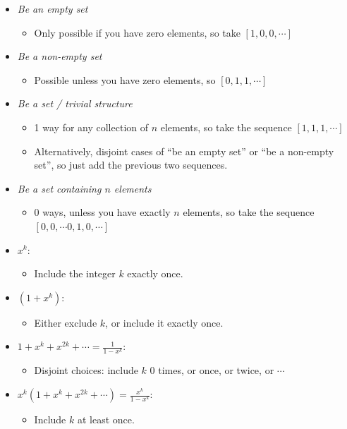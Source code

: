 \begin{itemize}
\tightlist
\item
  \emph{Be an empty set}

  \begin{itemize}
  \tightlist
  \item
    Only possible if you have zero elements, so take \([1,0,0,\cdots]\)
  \end{itemize}
\item
  \emph{Be a non-empty set}

  \begin{itemize}
  \tightlist
  \item
    Possible unless you have zero elements, so \([0, 1, 1, \cdots]\)
  \end{itemize}
\item
  \emph{Be a set / trivial structure}

  \begin{itemize}
  \tightlist
  \item
    1 way for any collection of \(n\) elements, so take the sequence
    \([1,1,1,\cdots]\)
  \item
    Alternatively, disjoint cases of ``be an empty set'' or ``be a
    non-empty set'', so just add the previous two sequences.
  \end{itemize}
\item
  \emph{Be a set containing \(n\) elements}

  \begin{itemize}
  \tightlist
  \item
    0 ways, unless you have exactly \(n\) elements, so take the sequence
    \([0, 0, \cdots 0, 1, 0, \cdots]\)
  \end{itemize}
\item
  \(x^k:\)

  \begin{itemize}
  \tightlist
  \item
    Include the integer \(k\) exactly once.
  \end{itemize}
\item
  \((1 + x^k):\)

  \begin{itemize}
  \tightlist
  \item
    Either exclude \(k\), or include it exactly once.
  \end{itemize}
\item
  \(1 + x^k + x^{2k} + \cdots = \frac 1 {1-x^k}:\)

  \begin{itemize}
  \tightlist
  \item
    Disjoint choices: include \(k\) 0 times, or once, or twice, or
    \(\cdots\)
  \end{itemize}
\item
  \(x^k(1 + x^k + x^{2k} + \cdots) = \frac{x^k}{1-x^k}:\)

  \begin{itemize}
  \tightlist
  \item
    Include \(k\) at least once.
  \end{itemize}
\end{itemize}

